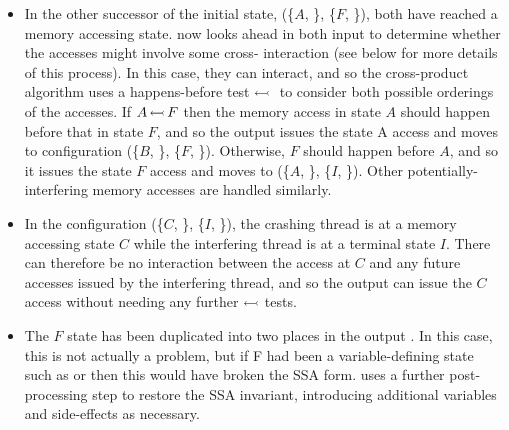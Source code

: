 \begin{itemize}
\item In the other successor of the initial state, (\{$A$, {\false}\},
  \{$F$, {\false}\}), both {\StateMachines} have reached a memory
  accessing state.  {\Technique} now looks ahead in both input
  {\StateMachines} to determine whether the accesses might involve
  some cross-{\StateMachine} interaction (see below for more details
  of this process).  In this case, they can interact, and so the
  cross-product algorithm uses a happens-before test
  $\leftarrowtail{}$ to consider both possible orderings of the
  accesses.  If $A\,{\leftarrowtail}\,F$ then the memory access in state
  $A$ should happen before that in state $F$, and so the output
  {\StateMachine} issues the state A access and moves to configuration
  (\{$B$, {\true}\}, \{$F$, {\false}\}).  Otherwise, $F$ should happen
  before $A$, and so it issues the state $F$ access and moves to
  (\{$A$, {\false}\}, \{$I$, {\true}\}).  Other
  potentially-interfering memory accesses are handled similarly.

\item In the configuration (\{$C$, {\true}\}, \{$I$, {\true}\}),
  the crashing thread {\StateMachine} is at a memory accessing state
  $C$ while the interfering thread {\StateMachine} is at a terminal
  state $I$.  There can therefore be no interaction between the access
  at $C$ and any future accesses issued by the interfering thread, and
  so the output {\StateMachine} can issue the $C$ access without needing
  any further $\leftarrowtail$ tests.

\item The $F$ state has been duplicated into two places in the output
  {\StateMachine}.  In this case, this is not actually a problem, but
  if F had been a variable-defining state such as  or
   then this would have broken the SSA form.  {\Technique}
  uses a further post-processing step to restore the SSA invariant,
  introducing additional variables and \state{$\Phi$} side-effects as
  necessary.
\end{itemize}

